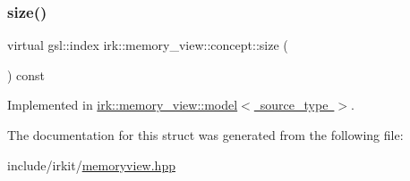 \subsubsection{\texorpdfstring{size()}{size()}}
{\footnotesize\ttfamily virtual gsl\+::index irk\+::memory\+\_\+view\+::concept\+::size (\begin{DoxyParamCaption}{ }\end{DoxyParamCaption}) const\hspace{0.3cm}{\ttfamily [pure virtual]}}



Implemented in \mbox{\hyperlink{classirk_1_1memory__view_1_1model_a88bdaaf00f71b733bb67ea912ed78251}{irk\+::memory\+\_\+view\+::model$<$ source\+\_\+type $>$}}.



The documentation for this struct was generated from the following file\+:\begin{DoxyCompactItemize}
\item 
include/irkit/\mbox{\hyperlink{memoryview_8hpp}{memoryview.\+hpp}}\end{DoxyCompactItemize}
